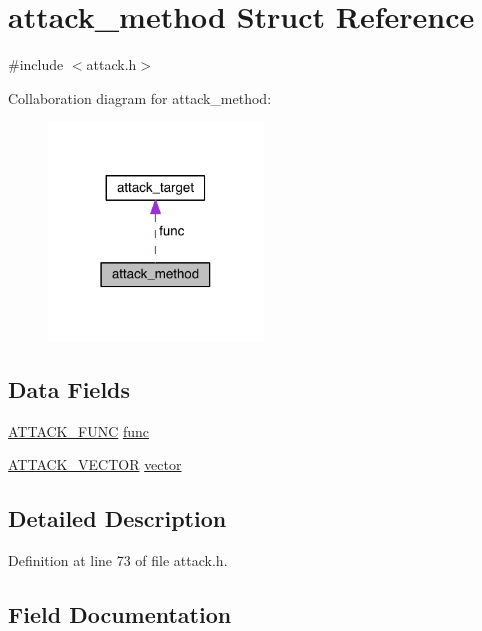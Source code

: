 \hypertarget{structattack__method}{}\section{attack\+\_\+method Struct Reference}
\label{structattack__method}


{\ttfamily \#include $<$attack.\+h$>$}



Collaboration diagram for attack\+\_\+method\+:
\nopagebreak
\begin{figure}[H]
\begin{center}
\leavevmode
\includegraphics[width=162pt]{structattack__method__coll__graph}
\end{center}
\end{figure}
\subsection*{Data Fields}
\begin{DoxyCompactItemize}
\item 
\hyperlink{attack_8h_a5eb6c3d025947541be2af2b80b9b655a}{A\+T\+T\+A\+C\+K\+\_\+\+F\+U\+NC} \hyperlink{structattack__method_aebaf915269bb6b354f5e81bdb1153864}{func}
\item 
\hyperlink{attack_8h_a0fb3d519486301242753dc8e7f175683}{A\+T\+T\+A\+C\+K\+\_\+\+V\+E\+C\+T\+OR} \hyperlink{structattack__method_a5aff1489b7c5bb556d4931e452408bcf}{vector}
\end{DoxyCompactItemize}


\subsection{Detailed Description}


Definition at line 73 of file attack.\+h.



\subsection{Field Documentation}
